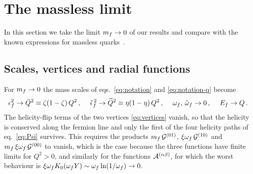 \section{The massless limit}
\label{sec:massless}

In this section we take the limit $m_f\to0$ of our results and compare with the known expressions for
massless quarks~\cite{Iancu:2022gpw}.

\subsection{Scales, vertices and radial functions}

For $m_f\to0$ the mass scales of eqs.~\eqref{eq:notation} and \eqref{eq:notation-q} become
\begin{equation}
\epsilon_f^2\to\bar Q^2\equiv\zeta(1-\zeta)\,Q^2\,,\quad\;\tilde{\epsilon}_f^{\,2}\to\widetilde Q^2\equiv\eta(1-\eta)\,Q^2\,,\quad\;
\omega_f,\,\tilde{\omega}_f\to0\,,\quad\;E_f\to Q\,.
\end{equation}
The helicity-flip terms of the two vertices \eqref{eq:vertices} vanish, so that the helicity is
conserved along the fermion line and only the first of the four helicity paths of
eq.~\eqref{eq:Psi} survives. This requires the products $m_f\,\mathcal{G}^{(01)}$, $\xi\omega_f\,\mathcal{G}^{(10)}$ and
$m_f\,\xi\omega_f\,\mathcal{G}^{(00)}$ to vanish, which is the case because the three functions have finite limits
for $Q^2>0$, and similarly for the functions $\mathcal{A}^{(\alpha\beta)}$, for which the worst behaviour is
$\xi\omega_f K_0(\omega_f Y)\sim\omega_f\ln(1/\omega_f)\to0$.

